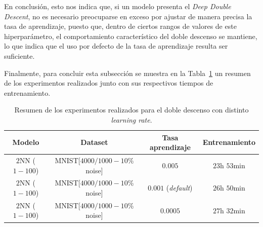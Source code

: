 En conclusión, esto nos indica que, si un modelo presenta el \textit{Deep Double Descent}, no es necesario preocuparse en exceso por ajustar de manera precisa la tasa de aprendizaje, puesto que, dentro de ciertos rangos de valores de este hiperparámetro, el comportamiento característico del doble descenso se mantiene, lo que indica que el uso por defecto de la tasa de aprendizaje resulta ser suficiente.

Finalmente, para concluir esta subsección se muestra en la Tabla~\ref{tab:difflr} un resumen de los experimentos realizados junto con sus respectivos tiempos de entrenamiento.

\begin{table}[h!]
    \centering
    \begin{tabular}{|c|c|c|c|}
    \hline
    \textbf{Modelo}       & \textbf{Dataset} & \textbf{Tasa aprendizaje} & \textbf{Entrenamiento} \\ 
    \hline
    $2$NN ($1-100$)     & MNIST[$4000/1000 - 10$\% noise]      & $0.005$      & $23$h $53$min         \\ 
    $2$NN ($1-100$)     & MNIST[$4000/1000 - 10$\% noise]      & $0.001$ (\textit{default})      & $26$h $50$min     \\ 
    $2$NN ($1-100$)     & MNIST[$4000/1000 - 10$\% noise]      & $0.0005$      & $27$h $32$min         \\ 
    \hline
    \end{tabular}
    \caption[Resumen de los experimentos realizados para el doble descenso con distinto \textit{learning rate}.]{Resumen de los experimentos realizados para el doble descenso con distinto \textit{learning rate}.}\label{tab:difflr}
\end{table}

\endinput
